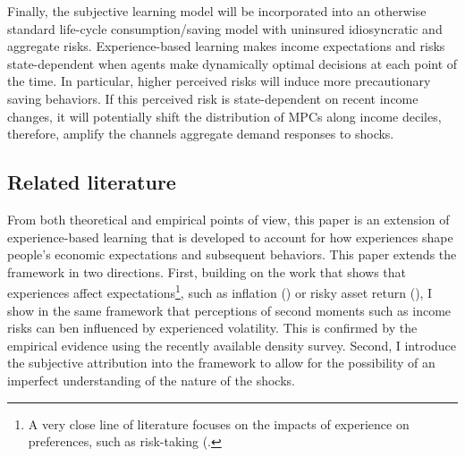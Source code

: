 \documentclass[12pt,notitlepage,onecolumn,aps,pra]{article}
\begin{document}
Finally, the subjective learning model will be incorporated into an
otherwise standard life-cycle consumption/saving model with uninsured
idiosyncratic and aggregate risks. Experience-based learning makes
income expectations and risks state-dependent when agents make
dynamically optimal decisions at each point of the time. In particular,
higher perceived risks will induce more precautionary saving behaviors.
If this perceived risk is state-dependent on recent income changes, it
will potentially shift the distribution of MPCs along income deciles,
therefore, amplify the channels aggregate demand responses to shocks.

\hypertarget{related-literature}{%
\subsection{Related literature}\label{related-literature}}

From both theoretical and empirical points of view, this paper is an
extension of experience-based learning that is developed to account for
how experiences shape people's economic expectations and subsequent
behaviors. This paper extends the framework in two directions. First,
building on the work that shows that experiences affect
expectations\footnote{A very close line of literature focuses on the impacts of experience on preferences, such as risk-taking (\cite{malmendier2011depression}.},
such as inflation (\cite{malmendier2015learning}) or risky asset return
(\cite{malmendier2019investor}), I show in the same framework that
perceptions of second moments such as income risks can ben influenced by
experienced volatility. This is confirmed by the empirical evidence
using the recently available density survey. Second, I introduce the
subjective attribution into the framework to allow for the possibility
of an imperfect understanding of the nature of the shocks.
\end{document}
